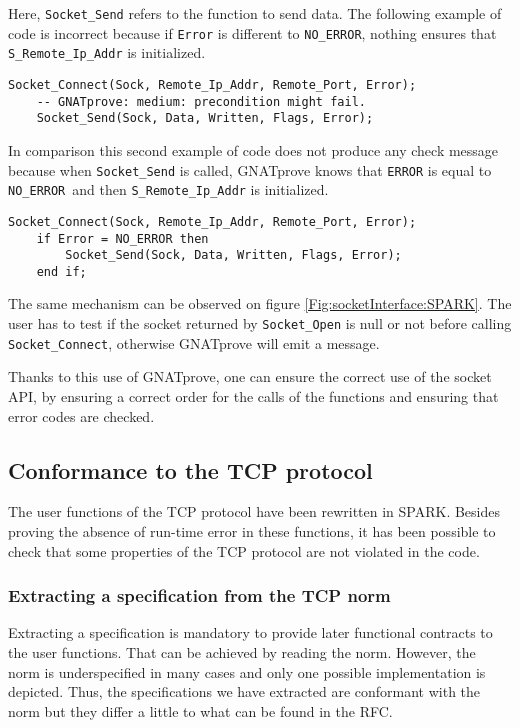 \documentclass[runningheads]{llncs}
\let\Spark\lstinline
\begin{document}
    Here, \Spark{Socket_Send} refers to the function to send data. The following example of code is incorrect because if \lstinline{Error} is
    different to \lstinline{NO_ERROR}, nothing ensures that \lstinline{S_Remote_Ip_Addr} is initialized.
    \begin{lstlisting}[style=Spark]
    Socket_Connect(Sock, Remote_Ip_Addr, Remote_Port, Error);
    -- GNATprove: medium: precondition might fail.
    Socket_Send(Sock, Data, Written, Flags, Error);
    \end{lstlisting}
    In comparison this second example of code does not produce any check message because when \Spark{Socket_Send} is called, GNATprove knows that
    \Spark{ERROR} is equal to \Spark{NO_ERROR} and then \Spark{S_Remote_Ip_Addr} is initialized.
    \begin{lstlisting}[style=Spark]
    Socket_Connect(Sock, Remote_Ip_Addr, Remote_Port, Error);
    if Error = NO_ERROR then
        Socket_Send(Sock, Data, Written, Flags, Error);
    end if;
    \end{lstlisting}

    The same mechanism can be observed on figure \ref{Fig:socketInterface:SPARK}. The user has to test if the socket returned by
    \Spark{Socket_Open} is null or not before calling \Spark{Socket_Connect}, otherwise GNATprove will emit a message.

    Thanks to this use of GNATprove, one can ensure the correct use of the socket API, by ensuring a correct order for the
    calls of the functions and ensuring that error codes are checked.


\subsection{Conformance to the TCP protocol}

    The user functions of the TCP protocol have been rewritten in SPARK. Besides proving the absence of run-time error in these functions,
    it has been possible to check that some properties of the TCP protocol are not violated in the code.

\subsubsection{Extracting a specification from the TCP norm}

    Extracting a specification is mandatory to provide later functional contracts to the user functions.
    That can be achieved by reading the norm. However, the norm is underspecified in many cases and only one possible implementation
    is depicted. Thus, the specifications we have extracted are conformant with the norm but they differ a little to
    what can be found in the RFC.
\end{document}
